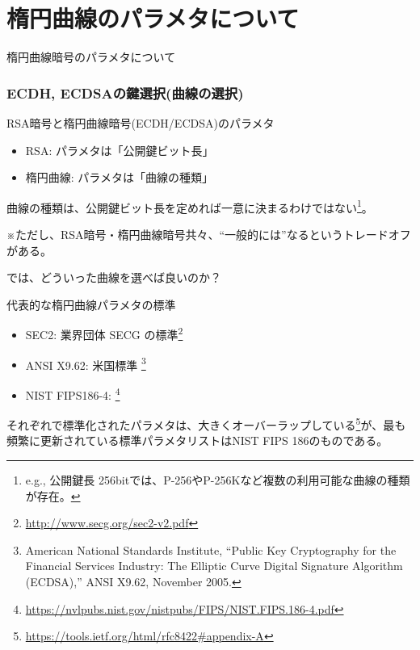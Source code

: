 \documentclass[12pt,dvipdfmx]{beamer}
\begin{document}
\section{楕円曲線のパラメタについて}
\begin{frame}
\centering
{\Large 楕円曲線暗号のパラメタについて}
\end{frame}

\begin{frame}
\frametitle{ECDH, ECDSAの鍵選択(曲線の選択)}
\begin{block}{\small RSA暗号と楕円曲線暗号(ECDH/ECDSA)のパラメタ}
\begin{itemize}
 \item RSA: パラメタは「公開鍵ビット長」
 \item 楕円曲線: パラメタは「曲線の種類」
\end{itemize}
\end{block}
曲線の種類は、公開鍵ビット長を定めれば一意に決まるわけではない\footnote[frame]{\scriptsize e.g., 公開鍵長 256bitでは、P-256やP-256Kなど複数の利用可能な曲線の種類が存在。}。

\begin{alertblock}{}
※ただし、RSA暗号・楕円曲線暗号共々、``一般的には''なるというトレードオフがある。 
\end{alertblock}
\end{frame}

\begin{frame}
では、どういった曲線を選べば良いのか？

\begin{block}{\small 代表的な楕円曲線パラメタの標準}
\begin{itemize}
 \item SEC2: 業界団体 SECG の標準\footnote[frame]{\scriptsize \url{http://www.secg.org/sec2-v2.pdf}}
 \item ANSI X9.62: 米国標準 \footnote[frame]{\scriptsize American National Standards Institute, ``Public Key Cryptography for the Financial Services Industry: The Elliptic Curve Digital Signature Algorithm (ECDSA),'' ANSI X9.62, November 2005.}
 \item NIST FIPS186-4: \footnote[frame]{\scriptsize \url{https://nvlpubs.nist.gov/nistpubs/FIPS/NIST.FIPS.186-4.pdf}}
\end{itemize}
\end{block}
それぞれで標準化されたパラメタは、大きくオーバーラップしている\footnote[frame]{\scriptsize \url{https://tools.ietf.org/html/rfc8422\#appendix-A}}が、\alert{最も頻繁に更新されている標準パラメタリストはNIST FIPS 186}のものである。
\end{frame}
\end{document}
